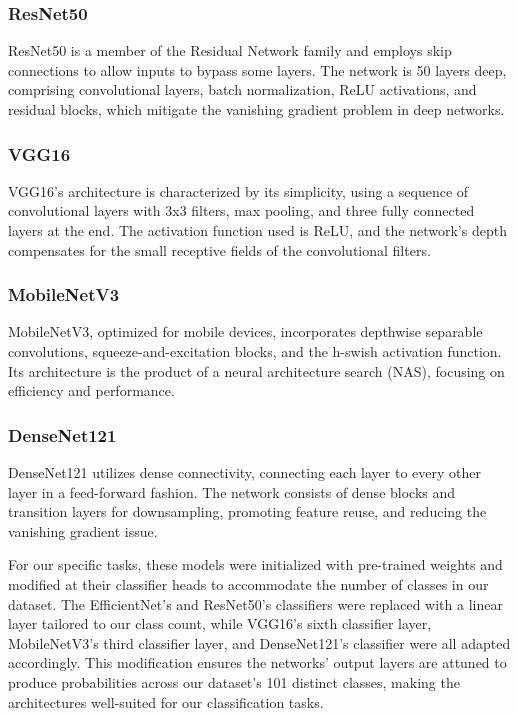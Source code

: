 \documentclass{article}
\begin{document}
\subsubsection*{ResNet50}
ResNet50 is a member of the Residual Network family and employs skip connections to allow inputs to bypass some layers. The network is 50 layers deep, comprising convolutional layers, batch normalization, ReLU activations, and residual blocks, which mitigate the vanishing gradient problem in deep networks.

\subsubsection*{VGG16}
VGG16's architecture is characterized by its simplicity, using a sequence of convolutional layers with 3x3 filters, max pooling, and three fully connected layers at the end. The activation function used is ReLU, and the network's depth compensates for the small receptive fields of the convolutional filters.

\subsubsection*{MobileNetV3}
MobileNetV3, optimized for mobile devices, incorporates depthwise separable convolutions, squeeze-and-excitation blocks, and the h-swish activation function. Its architecture is the product of a neural architecture search (NAS), focusing on efficiency and performance.

\subsubsection*{DenseNet121}
DenseNet121 utilizes dense connectivity, connecting each layer to every other layer in a feed-forward fashion. The network consists of dense blocks and transition layers for downsampling, promoting feature reuse, and reducing the vanishing gradient issue.

For our specific tasks, these models were initialized with pre-trained weights and modified at their classifier heads to accommodate the number of classes in our dataset. The EfficientNet's and ResNet50's classifiers were replaced with a linear layer tailored to our class count, while VGG16's sixth classifier layer, MobileNetV3's third classifier layer, and DenseNet121's classifier were all adapted accordingly. This modification ensures the networks' output layers are attuned to produce probabilities across our dataset's 101 distinct classes, making the architectures well-suited for our classification tasks.
\end{document}
